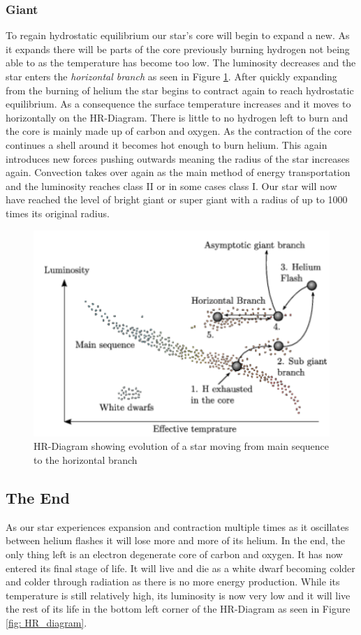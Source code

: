 \documentclass[reprint,english,notitlepage]{revtex4-2}
\begin{document}
\subsubsection*{Giant}  
To regain hydrostatic equilibrium our star's core will begin to expand a new. As it expands there will be parts of the core previously burning hydrogen not being able to as the temperature has become too low. The luminosity decreases and the star enters the \textit{horizontal branch} as seen in Figure \ref{fig: Main to giant}. After quickly expanding from the burning of helium the star begins to contract again to reach hydrostatic equilibrium. As a consequence the surface temperature increases and it moves to horizontally on the HR-Diagram. There is little to no hydrogen left to burn and the core is mainly made up of carbon and oxygen. As the contraction of the core continues a shell around it becomes hot enough to burn helium. This again introduces new forces pushing outwards meaning the radius of the star increases again. Convection takes over again as the main method of energy transportation and the luminosity reaches class II or in some cases class I. Our star will now have reached the level of bright giant or super giant with a radius of up to 1000 times its original radius. 

\begin{figure}[h!]
  \centering
  \includegraphics[scale = .5]{figures/horizontal_branch}
  \caption{HR-Diagram showing evolution of a star moving from main sequence to the horizontal branch}
  \label{fig: Main to giant}
\end{figure}  

\subsection{The End}
As our star experiences expansion and contraction multiple times as it oscillates between helium flashes it will lose more and more of its helium. In the end, the only thing left is an electron degenerate core of carbon and oxygen. It has now entered its final stage of life. It will live and die as a white dwarf becoming colder and colder through radiation as there is no more energy production. While its temperature is still relatively high, its luminosity is now very low and it will live the rest of its life in the bottom left corner of the HR-Diagram as seen in Figure \ref{fig: HR_diagram}. 
\end{document}
